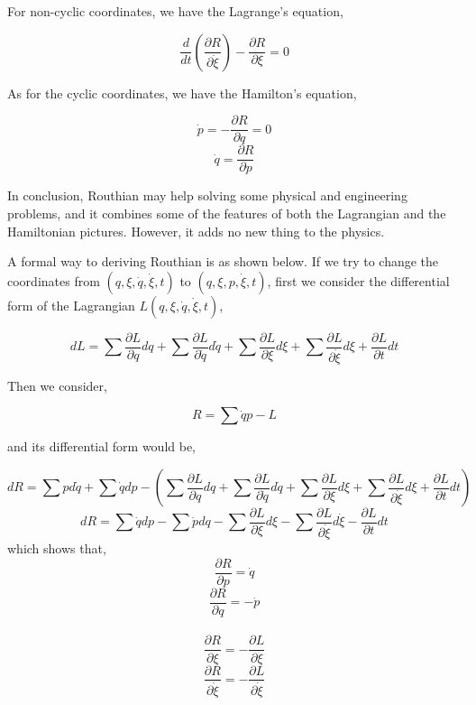\documentclass[12pt]{article}
\begin{document}
For non-cyclic coordinates, we have the Lagrange's equation,

\begin{center}
    \[ \frac{d}{dt} \left( \frac{\partial R}{\partial \dot{\xi}} \right) - \frac{\partial R}{\partial \xi} = 0 \]
\end{center}

As for the cyclic coordinates, we have the Hamilton's equation,

\begin{center}
    \[ \dot{p} = -\frac{\partial R}{\partial q} = 0\]
    \[ \dot{q} = \frac{\partial R}{\partial p}\]
\end{center}

In conclusion, Routhian may help solving some physical and engineering problems, and it combines some of the features of both the Lagrangian and the Hamiltonian pictures. However, it adds no new thing to the physics.

A formal way to deriving Routhian is as shown below.
If we try to change the coordinates from $(q, \xi, \dot{q}, \dot{\xi}, t)$ to $(q, \xi, p, \dot{\xi}, t)$, first we consider the differential form of the Lagrangian $L(q, \xi, \dot{q}, \dot{\xi}, t)$,

\begin{center}
    \[ dL = \sum{\frac{\partial L}{\partial q} dq} + \sum{\frac{\partial L}{\partial \dot{q}} d\dot{q}} + \sum{\frac{\partial L}{\partial \xi} d\xi} + \sum{\frac{\partial L}{\partial \dot{\xi}} d\xi} + \frac{\partial L}{\partial t}dt \]
\end{center}

Then we consider,

\begin{center}
    \[ R = \sum{\dot{q}p} - L \]
\end{center}

and its differential form would be,

\begin{center}
    \[ dR = \sum{pd\dot{q}} + \sum{\dot{q}dp} - \left(\sum{\frac{\partial L}{\partial q} dq} + \sum{\frac{\partial L}{\partial \dot{q}} d\dot{q}} + \sum{\frac{\partial L}{\partial \xi} d\xi} + \sum{\frac{\partial L}{\partial \dot{\xi}} d\xi} + \frac{\partial L}{\partial t}dt \right) \]
    \[ dR = \sum{\dot{q}dp} - \sum{\dot{p}dq} - \sum{\frac{\partial L}{\partial \xi}d\xi} - \sum{\frac{\partial L}{\partial \dot{\xi}}d\dot{\xi}} - \frac{\partial L}{\partial t}dt \]
    which shows that,
    \[ \frac{\partial R}{\partial p} = \dot{q} \]
    \[ \frac{\partial R}{\partial q} = - \dot{p} \]\\
    \[ \frac{\partial R}{\partial \xi} = -\frac{\partial L}{\partial \xi} \]
    \[ \frac{\partial R}{\partial \dot{\xi}} = - \frac{\partial L}{\partial \dot{\xi}} \]
\end{center}
\end{document}
